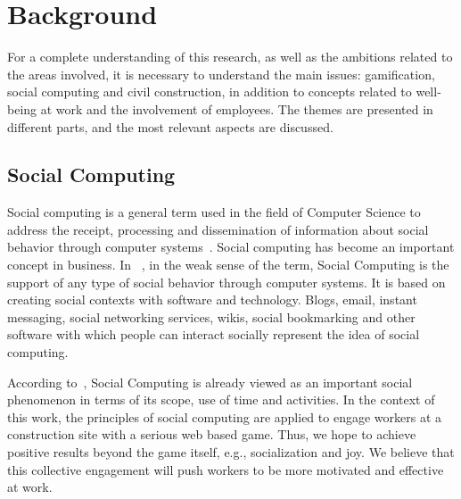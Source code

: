 \section{Background}
\label{background}
For a complete understanding of this research, as well as the ambitions related to the areas involved, it is necessary to understand the main issues: gamification, social computing and civil construction, in addition to concepts related to well-being at work and the involvement of employees. The themes are presented in different parts, and the most relevant aspects are discussed.

\subsection{Social Computing}
Social computing is a general term used in the field of Computer Science to address the receipt, processing and dissemination of information about social behavior through computer systems~\cite{Masunaga}. Social computing has become an important concept in business. In ~\cite{Masunaga}, in the weak sense of the term, Social Computing is the support of any type of social behavior through computer systems. It is based on creating social contexts with software and technology. Blogs, email, instant messaging, social networking services, wikis, social bookmarking and other software with which people can interact socially represent the idea of social computing. 

 
According to~\cite{IPTS}, Social Computing is already viewed as an important social phenomenon in terms of its scope, use of time and activities. In the context of this work, the principles of social computing are applied to engage workers at a construction site with a serious web based game. Thus, we hope to achieve positive results beyond the game itself, e.g., socialization and joy. We believe that this collective engagement will push workers to be  more motivated and effective at work. 


